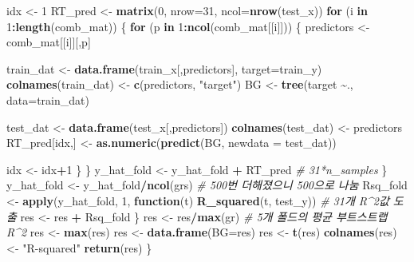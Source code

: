 \documentclass[
]{article}
\newenvironment{Shaded}{\begin{snugshade}}{\end{snugshade}}
\newcommand{\AttributeTok}[1]{\textcolor[rgb]{0.13,0.29,0.53}{#1}}
\newcommand{\CommentTok}[1]{\textcolor[rgb]{0.56,0.35,0.01}{\textit{#1}}}
\newcommand{\ControlFlowTok}[1]{\textcolor[rgb]{0.13,0.29,0.53}{\textbf{#1}}}
\newcommand{\DecValTok}[1]{\textcolor[rgb]{0.00,0.00,0.81}{#1}}
\newcommand{\FunctionTok}[1]{\textcolor[rgb]{0.13,0.29,0.53}{\textbf{#1}}}
\newcommand{\NormalTok}[1]{#1}
\newcommand{\OtherTok}[1]{\textcolor[rgb]{0.56,0.35,0.01}{#1}}
\newcommand{\SpecialCharTok}[1]{\textcolor[rgb]{0.81,0.36,0.00}{\textbf{#1}}}
\newcommand{\StringTok}[1]{\textcolor[rgb]{0.31,0.60,0.02}{#1}}
\begin{document}
\begin{Shaded}
\begin{Highlighting}[]
\NormalTok{      idx }\OtherTok{\textless{}{-}} \DecValTok{1}
\NormalTok{      RT\_pred }\OtherTok{\textless{}{-}} \FunctionTok{matrix}\NormalTok{(}\DecValTok{0}\NormalTok{, }\AttributeTok{nrow=}\DecValTok{31}\NormalTok{, }\AttributeTok{ncol=}\FunctionTok{nrow}\NormalTok{(test\_x))}
      \ControlFlowTok{for}\NormalTok{ (i }\ControlFlowTok{in} \DecValTok{1}\SpecialCharTok{:}\FunctionTok{length}\NormalTok{(comb\_mat)) \{}
        \ControlFlowTok{for}\NormalTok{ (p }\ControlFlowTok{in} \DecValTok{1}\SpecialCharTok{:}\FunctionTok{ncol}\NormalTok{(comb\_mat[[i]])) \{}
\NormalTok{          predictors }\OtherTok{\textless{}{-}}\NormalTok{ comb\_mat[[i]][,p]}
          
\NormalTok{          train\_dat }\OtherTok{\textless{}{-}} \FunctionTok{data.frame}\NormalTok{(train\_x[,predictors], }\AttributeTok{target=}\NormalTok{train\_y)}
          \FunctionTok{colnames}\NormalTok{(train\_dat) }\OtherTok{\textless{}{-}} \FunctionTok{c}\NormalTok{(predictors, }\StringTok{"target"}\NormalTok{)}
\NormalTok{          BG }\OtherTok{\textless{}{-}} \FunctionTok{tree}\NormalTok{(target }\SpecialCharTok{\textasciitilde{}}\NormalTok{., }\AttributeTok{data=}\NormalTok{train\_dat)}
          
\NormalTok{          test\_dat }\OtherTok{\textless{}{-}} \FunctionTok{data.frame}\NormalTok{(test\_x[,predictors])}
          \FunctionTok{colnames}\NormalTok{(test\_dat) }\OtherTok{\textless{}{-}}\NormalTok{ predictors}
\NormalTok{          RT\_pred[idx,] }\OtherTok{\textless{}{-}} \FunctionTok{as.numeric}\NormalTok{(}\FunctionTok{predict}\NormalTok{(BG, }\AttributeTok{newdata =}\NormalTok{ test\_dat))}

\NormalTok{          idx }\OtherTok{\textless{}{-}}\NormalTok{ idx}\SpecialCharTok{+}\DecValTok{1}
\NormalTok{        \}}
\NormalTok{      \}}
\NormalTok{      y\_hat\_fold }\OtherTok{\textless{}{-}}\NormalTok{ y\_hat\_fold }\SpecialCharTok{+}\NormalTok{ RT\_pred }\CommentTok{\# 31*n\_samples}
\NormalTok{    \}}
\NormalTok{    y\_hat\_fold }\OtherTok{\textless{}{-}}\NormalTok{ y\_hat\_fold}\SpecialCharTok{/}\FunctionTok{ncol}\NormalTok{(grs) }\CommentTok{\# 500번 더해졌으니 500으로 나눔}
\NormalTok{    Rsq\_fold }\OtherTok{\textless{}{-}} \FunctionTok{apply}\NormalTok{(y\_hat\_fold, }\DecValTok{1}\NormalTok{, }\ControlFlowTok{function}\NormalTok{(t) }\FunctionTok{R\_squared}\NormalTok{(t, test\_y)) }\CommentTok{\# 31개 R\^{}2값 도출}
\NormalTok{    res }\OtherTok{\textless{}{-}}\NormalTok{ res }\SpecialCharTok{+}\NormalTok{ Rsq\_fold}
\NormalTok{  \}}
\NormalTok{  res }\OtherTok{\textless{}{-}}\NormalTok{ res}\SpecialCharTok{/}\FunctionTok{max}\NormalTok{(gr) }\CommentTok{\# 5개 폴드의 평균 부트스트랩 R\^{}2}
\NormalTok{  res }\OtherTok{\textless{}{-}} \FunctionTok{max}\NormalTok{(res)}
\NormalTok{  res }\OtherTok{\textless{}{-}} \FunctionTok{data.frame}\NormalTok{(}\AttributeTok{BG=}\NormalTok{res)}
\NormalTok{  res }\OtherTok{\textless{}{-}} \FunctionTok{t}\NormalTok{(res)}
  \FunctionTok{colnames}\NormalTok{(res) }\OtherTok{\textless{}{-}} \StringTok{"R{-}squared"}
  \FunctionTok{return}\NormalTok{(res)}
\NormalTok{\}}


\end{Highlighting}
\end{Shaded}
\end{document}

